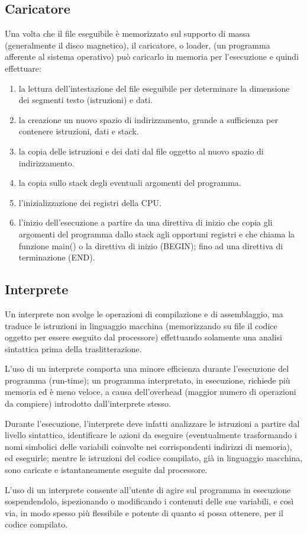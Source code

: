 \documentclass[12pt]{article} %
\begin{document}
\subsection{Caricatore}
Una volta che il file eseguibile è memorizzato sul supporto di massa (generalmente il disco magnetico), il caricatore, o loader, (un programma afferente al sistema operativo) può caricarlo in memoria per l’esecuzione e quindi effettuare:
\begin{enumerate}
    \item la lettura dell’intestazione del file eseguibile per determinare la dimensione dei segmenti testo (istruzioni) e dati.
    \item la creazione un nuovo spazio di indirizzamento, grande a sufficienza per contenere istruzioni, dati e stack.
    \item la copia delle istruzioni e dei dati dal file oggetto al nuovo spazio di indirizzamento.
    \item la copia sullo stack degli eventuali argomenti del programma.
    \item l’inizializzazione dei registri della CPU.
    \item  l’inizio dell’esecuzione a partire da una direttiva di inizio che copia gli argomenti del programma dallo stack agli opportuni registri e che chiama la funzione main() o la direttiva di inizio (BEGIN); fino ad una direttiva di terminazione (END).
\end{enumerate}

\subsection{\textbf{Interprete}}
Un interprete non svolge le operazioni di compilazione e di assemblaggio, ma traduce le istruzioni in linguaggio macchina (memorizzando su file il codice oggetto per essere eseguito dal processore) effettuando solamente una analisi sintattica prima della traslitterazione.\par\medskip\noindent
L’uso di un interprete comporta una minore efficienza durante l’esecuzione del programma (run-time); un programma interpretato, in esecuzione, richiede più memoria ed è meno veloce, a causa dell'overhead (maggior numero di operazioni da compiere) introdotto dall'interprete stesso.\par\medskip\noindent
Durante l'esecuzione, l'interprete deve infatti analizzare le istruzioni a partire dal livello sintattico, identificare le azioni da eseguire (eventualmente trasformando i nomi simbolici delle variabili coinvolte nei corrispondenti indirizzi di memoria), ed eseguirle; mentre le istruzioni del codice compilato, già in linguaggio macchina, sono caricate e istantaneamente eseguite dal processore.\par\medskip\noindent
L'uso di un interprete consente all'utente di agire sul programma in esecuzione sospendendolo, ispezionando o modificando i contenuti delle sue variabili, e così via, in modo spesso più flessibile e potente di quanto si possa ottenere, per il codice compilato.
\newpage
\end{document}
